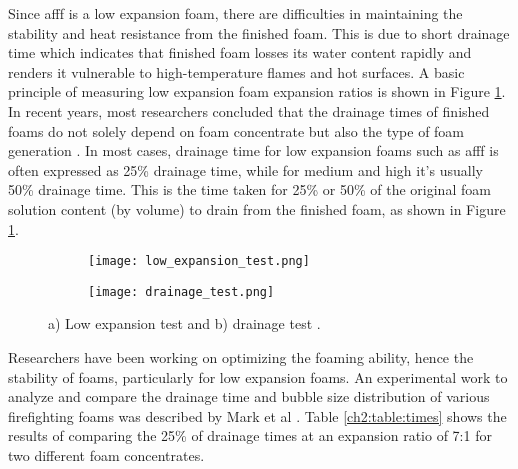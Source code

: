 Since \acrshort{afff} is a low expansion foam, there are difficulties in maintaining the stability and heat resistance from the finished foam. This is due to short drainage time which indicates that finished foam losses its water content rapidly and renders it vulnerable to high-temperature flames and hot surfaces. A basic principle of measuring low expansion foam expansion ratios is shown in Figure \ref{ch2:figure:tests}. In recent years, most researchers concluded that the drainage times of finished foams do not solely depend on foam concentrate but also the type of foam generation \cite{martin2012fire}. In most cases, drainage time for low expansion foams such as \acrshort{afff} is often expressed as 25\% drainage time, while for medium and high it's usually 50\% drainage time. This is the time taken for 25\% or 50\% of the original foam solution content (by volume) to drain from the finished foam, as shown in Figure \ref{ch2:figure:tests}.

\begin{figure}[H]

\centering
\begin{subfigure}{.45\textwidth}
    \centering
    \texttt{[image: low\_expansion\_test.png]}
    \caption{}
\end{subfigure}
\begin{subfigure}{.45\textwidth}
    \centering
    \texttt{[image: drainage\_test.png]}
    \caption{}
\end{subfigure}

\caption{a) Low expansion test and b) drainage test \cite{aamodt2020review}.}
\label{ch2:figure:tests}
\end{figure}

Researchers have been working on optimizing the foaming ability, hence the stability of foams, particularly for low expansion foams.  An experimental work to analyze and compare the drainage time and bubble size distribution of various firefighting foams was described by Mark et al \cite{laundess2012suppression}. Table \ref{ch2:table:times} shows the results of \cite{laundess2012suppression} comparing the 25\% of drainage times at an expansion ratio of 7:1 for two different foam concentrates. \\


